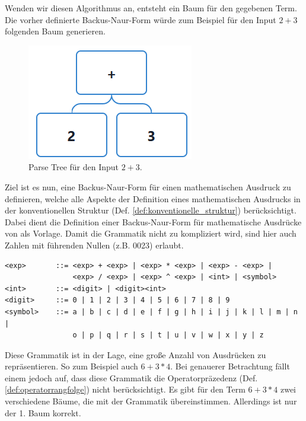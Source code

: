 \documentclass[11pt]{article}
\newcommand{\lab}[1]{(Def. \ref{#1})}
\begin{document}
Wenden wir diesen Algorithmus an, 
entsteht ein Baum für den gegebenen Term.
Die vorher definierte Backus-Naur-Form würde 
zum Beispiel für den Input $2+3$ folgenden Baum generieren.

\begin{figure}[h]
  \centering
  \includegraphics[scale=0.5]{trees/beispiel_bnf_1.png}
  \caption{Parse Tree für den Input $2+3$.}
\end{figure}

Ziel ist es nun, eine Backus-Naur-Form für einen mathematischen Ausdruck 
zu definieren, welche alle Aspekte der Definition 
eines mathematischen Ausdrucks in der konventionellen Struktur 
\lab{def:konventionelle_struktur} berücksichtigt. Dabei dient die
Definition einer Backus-Naur-Form für mathematische Ausdrücke von \citeauthor{BNF_PT}
\cite{BNF_PT} als Vorlage. Damit die Grammatik nicht zu kompliziert wird, sind hier
auch Zahlen mit führenden Nullen (z.B. 0023) erlaubt. 

\begin{verbatim}
<exp>       ::= <exp> + <exp> | <exp> * <exp> | <exp> - <exp> | 
                <exp> / <exp> | <exp> ^ <exp> | <int> | <symbol>
<int>       ::= <digit> | <digit><int>
<digit>     ::= 0 | 1 | 2 | 3 | 4 | 5 | 6 | 7 | 8 | 9 
<symbol>    ::= a | b | c | d | e | f | g | h | i | j | k | l | m | n | 
                o | p | q | r | s | t | u | v | w | x | y | z
\end{verbatim}

Diese Grammatik ist in der Lage, eine große Anzahl von Ausdrücken zu repräsentieren. 
So zum Beispiel auch $6+3*4$. Bei genauerer Betrachtung fällt einem jedoch auf, 
dass diese Grammatik die Operatorpräzedenz \lab{def:operatorrangfolge} 
nicht berücksichtigt. 
Es gibt für den Term $6+3*4$ zwei verschiedene Bäume, 
die mit der Grammatik übereinstimmen. 
Allerdings ist nur der 1. Baum korrekt. 
\end{document}
